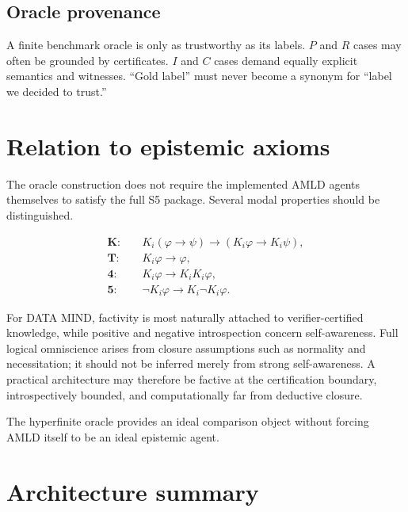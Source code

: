 \documentclass[11pt]{article}
\begin{document}
\subsection{Oracle provenance}

A finite benchmark oracle is only as trustworthy as its labels. $P$ and $R$ cases may often be grounded by certificates. $I$ and $C$ cases demand equally explicit semantics and witnesses. ``Gold label'' must never become a synonym for ``label we decided to trust.''

\section{Relation to epistemic axioms}

The oracle construction does not require the implemented AMLD agents themselves to satisfy the full S5 package. Several modal properties should be distinguished.

\begin{align*}
\mathbf K:&\quad K_i(\varphi\to\psi)\to(K_i\varphi\to K_i\psi),\\
\mathbf T:&\quad K_i\varphi\to\varphi,\\
\mathbf 4:&\quad K_i\varphi\to K_iK_i\varphi,\\
\mathbf 5:&\quad \neg K_i\varphi\to K_i\neg K_i\varphi.
\end{align*}

For DATA MIND, factivity is most naturally attached to verifier-certified knowledge, while positive and negative introspection concern self-awareness. Full logical omniscience arises from closure assumptions such as normality and necessitation; it should not be inferred merely from strong self-awareness. A practical architecture may therefore be factive at the certification boundary, introspectively bounded, and computationally far from deductive closure.

The hyperfinite oracle provides an ideal comparison object without forcing AMLD itself to be an ideal epistemic agent.

\section{Architecture summary}
\end{document}
